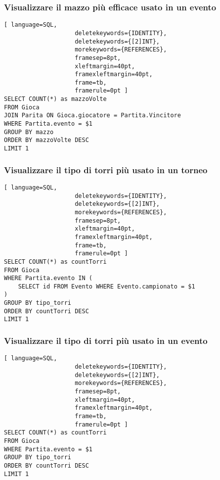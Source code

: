 \documentclass{article}
\begin{document}
\subsubsection{Visualizzare il mazzo più efficace usato in un evento}
\begin{lstlisting}[ language=SQL,
                    deletekeywords={IDENTITY},
                    deletekeywords={[2]INT},
                    morekeywords={REFERENCES},
                    framesep=8pt,
                    xleftmargin=40pt,
                    framexleftmargin=40pt,
                    frame=tb,
                    framerule=0pt ]
SELECT COUNT(*) as mazzoVolte
FROM Gioca
JOIN Parita ON Gioca.giocatore = Partita.Vincitore
WHERE Partita.evento = $1
GROUP BY mazzo
ORDER BY mazzoVolte DESC
LIMIT 1
\end{lstlisting}

\subsubsection{Visualizzare il tipo di torri più usato in un torneo}
\begin{lstlisting}[ language=SQL,
                    deletekeywords={IDENTITY},
                    deletekeywords={[2]INT},
                    morekeywords={REFERENCES},
                    framesep=8pt,
                    xleftmargin=40pt,
                    framexleftmargin=40pt,
                    frame=tb,
                    framerule=0pt ]
SELECT COUNT(*) as countTorri
FROM Gioca
WHERE Partita.evento IN (
    SELECT id FROM Evento WHERE Evento.campionato = $1
)
GROUP BY tipo_torri
ORDER BY countTorri DESC
LIMIT 1
\end{lstlisting}

\subsubsection{Visualizzare il tipo di torri più usato in un evento}
\begin{lstlisting}[ language=SQL,
                    deletekeywords={IDENTITY},
                    deletekeywords={[2]INT},
                    morekeywords={REFERENCES},
                    framesep=8pt,
                    xleftmargin=40pt,
                    framexleftmargin=40pt,
                    frame=tb,
                    framerule=0pt ]
SELECT COUNT(*) as countTorri
FROM Gioca
WHERE Partita.evento = $1
GROUP BY tipo_torri
ORDER BY countTorri DESC
LIMIT 1
\end{lstlisting}
\end{document}

